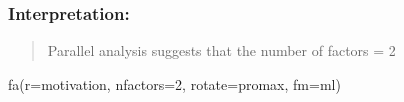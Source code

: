 \documentclass[
]{article}
\newenvironment{Shaded}{\begin{snugshade}}{\end{snugshade}}
\newcommand{\AttributeTok}[1]{\textcolor[rgb]{0.77,0.63,0.00}{#1}}
\newcommand{\DecValTok}[1]{\textcolor[rgb]{0.00,0.00,0.81}{#1}}
\newcommand{\FunctionTok}[1]{\textcolor[rgb]{0.00,0.00,0.00}{#1}}
\newcommand{\NormalTok}[1]{#1}
\newcommand{\StringTok}[1]{\textcolor[rgb]{0.31,0.60,0.02}{#1}}
\begin{document}
\hypertarget{interpretation-4}{%
\subsubsection{Interpretation:}\label{interpretation-4}}

\begin{quote}
Parallel analysis suggests that the number of factors = 2
\end{quote}

\begin{Shaded}
\begin{Highlighting}[]
\FunctionTok{fa}\NormalTok{(}\AttributeTok{r=}\NormalTok{motivation, }\AttributeTok{nfactors=}\DecValTok{2}\NormalTok{, }\AttributeTok{rotate=}\StringTok{\textquotesingle{}promax\textquotesingle{}}\NormalTok{, }\AttributeTok{fm=}\StringTok{\textquotesingle{}ml\textquotesingle{}}\NormalTok{)}
\end{Highlighting}
\end{Shaded}
\end{document}
